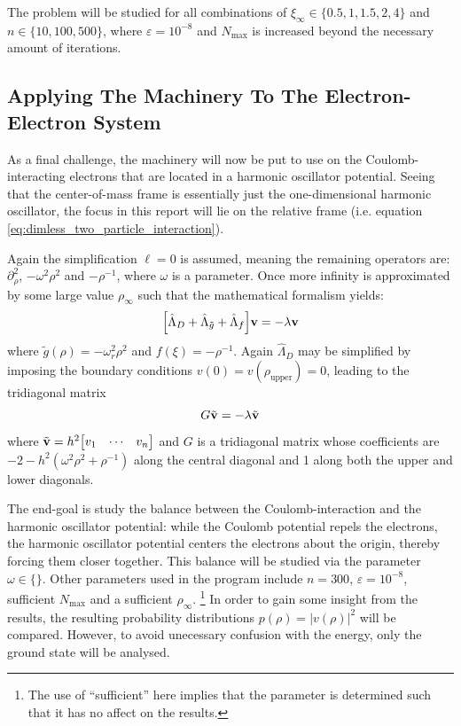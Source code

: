 \documentclass[reprint,english]{revtex4-1}
\begin{document}
The problem will be studied for all combinations of \(\xi_\infty\in\{0.5,1,1.5,2,4\}\) and \(n\in\{10,100,500\}\), where \(\varepsilon=10^{-8}\) and \(N_\text{max}\) is increased beyond the necessary amount of iterations. 
\subsection{Applying The Machinery To The Electron-Electron System}
As a final challenge, the machinery will now be put to use on the Coulomb-interacting electrons that are located in a harmonic oscillator potential. Seeing that the center-of-mass frame is essentially just the one-dimensional harmonic oscillator, the focus in this report will lie on the relative frame (i.e. equation \eqref{eq:dimless_two_particle_interaction}).

Again the simplification \(\ell=0\) is assumed, meaning the remaining operators are: \(\partial_\rho^2\), \(-\omega^2\rho^2\) and \(-\rho^{-1}\), where \(\omega\) is a parameter. Once more infinity is approximated by some large value \(\rho_\infty\) such that the mathematical formalism yields:
\begin{equation}\label{eq:discrete_dimless_interacting_electrons}
\Big[\hat{\Lambda}_D+\hat{\Lambda}_{\tilde{g}}+\hat{\Lambda}_f\Big]\vb{v}=-\lambda\vb{v}
\end{equation}
where \(\tilde{g}(\rho)=-\omega_r^2\rho^2\) and \(f(\xi)=-\rho^{-1}\). Again \(\hat{\Lambda}_D\) may be simplified by imposing the boundary conditions \(v(0)=v(\rho_\text{upper})=0\), leading to the tridiagonal matrix
\begin{equation}\label{eq:method:interacting_electrons}
G\tilde{\vb{v}}=-\lambda\tilde{\vb{v}}
\end{equation}
where \(\tilde{\vb{v}}=h^2\mqty[v_1&\cdots&v_n]\) and \(G\) is a tridiagonal matrix whose coefficients are \(-2-h^2(\omega^2\rho^2+\rho^{-1})\) along the central diagonal and 1 along both the upper and lower diagonals.

The end-goal is study the balance between the Coulomb-interaction and the harmonic oscillator potential: while the Coulomb potential repels the electrons, the harmonic oscillator potential centers the electrons about the origin, thereby forcing them closer together. This balance will be studied via the parameter \(\omega\in\{\}\). Other parameters used in the program include \(n=300\), \(\varepsilon=10^{-8}\), sufficient \(N_\text{max}\) and a sufficient \(\rho_\infty\). \footnote{The use of ``sufficient'' here implies that the parameter is determined such that it has no affect on the results.} In order to gain some insight from the results, the resulting probability distributions \(p(\rho)=|v(\rho)|^2\) will be compared. However, to avoid unecessary confusion with the energy, only the ground state will be analysed.
\end{document}
